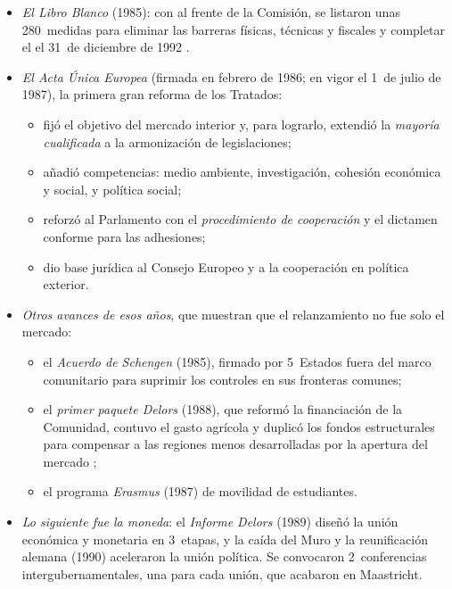 \documentclass[11pt]{article}
\begin{document}
\begin{itemize}
\item \emph{El Libro Blanco} (1985): con  al frente de la Comisión, se listaron unas 280~medidas para eliminar las barreras físicas, técnicas y fiscales y completar el  el 31~de diciembre de 1992 .
\item \emph{El Acta Única Europea} (firmada en febrero de 1986; en vigor el 1~de julio de 1987), la primera gran reforma de los Tratados:
  \begin{itemize}
  \item fijó el objetivo del mercado interior y, para lograrlo, extendió la \emph{mayoría cualificada} a la armonización de legislaciones;
  \item añadió competencias: medio ambiente, investigación, cohesión económica y social, y política social;
  \item reforzó al Parlamento con el \emph{procedimiento de cooperación} y el dictamen conforme para las adhesiones;
  \item dio base jurídica al Consejo Europeo y a la cooperación en política exterior.
  \end{itemize}
\item \emph{Otros avances de esos años}, que muestran que el relanzamiento no fue solo el mercado:
  \begin{itemize}
  \item el \emph{Acuerdo de Schengen} (1985), firmado por 5~Estados fuera del marco comunitario para suprimir los controles en sus fronteras comunes;
  \item el \emph{primer paquete Delors} (1988), que reformó la financiación de la Comunidad, contuvo el gasto agrícola y duplicó los fondos estructurales para compensar a las regiones menos desarrolladas por la apertura del mercado  ;
  \item el programa \emph{Erasmus} (1987) de movilidad de estudiantes.
  \end{itemize}
\item \emph{Lo siguiente fue la moneda}: el \emph{Informe Delors} (1989) diseñó la unión económica y monetaria en 3~etapas, y la caída del Muro y la reunificación alemana (1990) aceleraron la unión política. Se convocaron 2~conferencias intergubernamentales, una para cada unión, que acabaron en Maastricht.
\end{itemize}

\end{document}
